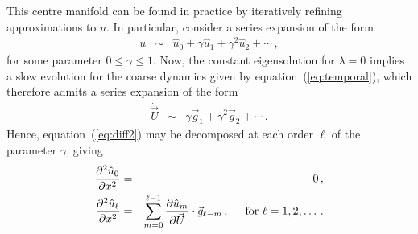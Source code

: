 \documentclass[12pt,a5paper]{article}
\begin{document}
This centre manifold can be found in practice by iteratively refining approximations to $u$. In particular, consider a series expansion of the form
\begin{eqnarray}
	u  & \sim & \hat{u}_0+\gamma\hat{u}_1+\gamma^2\hat{u}_2+\cdots\,,
\label{eq:u:series}
\end{eqnarray}
for some parameter $0\le\gamma\le 1$.
Now, the constant eigensolution for $\lambda=0$ implies a slow evolution for the coarse dynamics given by 
equation~(\ref{eq:temporal}), which therefore admits a series expansion of the form
\begin{eqnarray}
	\dot{{\vec U}} & \sim & \gamma {\vec g}_1+\gamma^2 {\vec g}_2+\cdots\,.
\label{eq:Udot:series}
\end{eqnarray}
Hence, equation~(\ref{eq:diff2}) may be decomposed at each order 
$\ell$ of the parameter $\gamma$, giving
\begin{eqnarray}
   \DD {x}{\hat{u}_0} & = & 0\,, \label{eq:pert1}
\\
  \DD {x}{\hat{u}_\ell} & = & \sum_{m=0}^{\ell-1}\D {\vec U}{\hat{u}_m}\cdot{\vec g}_{\ell-m}\,,
\hspace*{5mm}\mbox{for }\ell=1,2,\ldots\,.
\label{eq:pert_ell}
\end{eqnarray}
\end{document}
